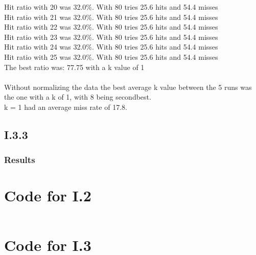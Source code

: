 \documentclass{article}
\begin{document}
Hit ratio with 20 was {\color{red}32.0\%}. With 80 tries 25.6 hits and 54.4 misses  \\
Hit ratio with 21 was {\color{red}32.0\%}. With 80 tries 25.6 hits and 54.4 misses  \\
Hit ratio with 22 was {\color{red}32.0\%}. With 80 tries 25.6 hits and 54.4 misses  \\
Hit ratio with 23 was {\color{red}32.0\%}. With 80 tries 25.6 hits and 54.4 misses  \\
Hit ratio with 24 was {\color{red}32.0\%}. With 80 tries 25.6 hits and 54.4 misses  \\
Hit ratio with 25 was {\color{red}32.0\%}. With 80 tries 25.6 hits and 54.4 misses  \\
The best ratio was: 77.75 with a k value of 1\\\\
Without normalizing the data the best average k value between the 5 runs was the one with a k of 1, with 8 being secondbest.\\
k = 1 had an average miss rate of 17.8.

\subsection{I.3.3}


\subsubsection*{Results}


\newpage
\begin{appendices}

\section{Code for I.2}

\inputminted{matlab}{matlab.m}

\section{Code for I.3}

\inputminted{python}{part2/neighborJohn.py}

\end{appendices}
\end{document}
